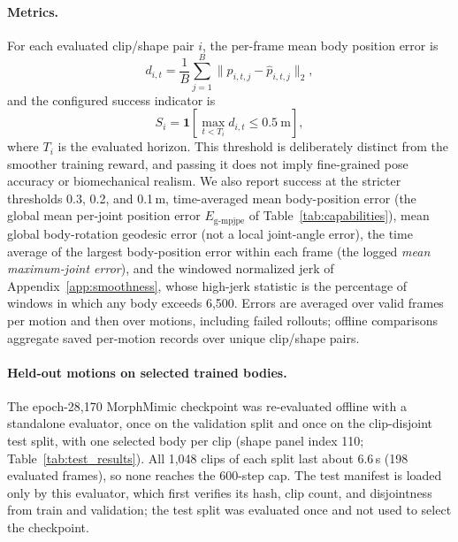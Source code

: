 \paragraph{Metrics.}\label{sec:metrics}
For each evaluated clip/shape pair $i$, the per-frame mean body position error is
\begin{equation}
    d_{i,t} = \frac{1}{B}\sum_{j=1}^{B}
                 \|p_{i,t,j}-\hat{p}_{i,t,j}\|_2 ,
\end{equation}
and the configured success indicator is
\begin{equation}
    S_i = \mathbf{1}\!\left[
             \max_{t<T_i}d_{i,t}\leq 0.5\ \mathrm{m}
          \right],
    \label{eq:success}
\end{equation}
where $T_i$ is the evaluated horizon. This threshold is deliberately distinct
from the smoother training reward, and passing it does not imply fine-grained
pose accuracy or biomechanical realism. We also report success at the stricter
thresholds 0.3, 0.2, and 0.1\,m, time-averaged mean
body-position error (the global mean per-joint position error $E_{\text{g-mpjpe}}$ of Table~\ref{tab:capabilities}), mean global body-rotation geodesic error (not a local
joint-angle error), the time average of the largest body-position error within
each frame (the logged \emph{mean maximum-joint error}), and the windowed
normalized jerk of Appendix~\ref{app:smoothness}, whose high-jerk statistic is
the percentage of windows in which any body exceeds 6,500. Errors are averaged
over valid frames per motion and then over motions, including failed rollouts;
offline comparisons aggregate saved per-motion records over unique clip/shape
pairs.

\paragraph{Held-out motions on selected trained bodies.}\label{sec:test_results}
The epoch-28,170 MorphMimic checkpoint was re-evaluated offline with a
standalone evaluator, once on the validation split and once on the clip-disjoint
test split, with one selected body per clip (shape panel index 110;
Table~\ref{tab:test_results}). All 1,048
clips of each split last about 6.6\,s (198 evaluated frames), so none reaches the
600-step cap. The test manifest is loaded only by this evaluator, which first
verifies its hash, clip count, and disjointness from train and validation; the
test split was evaluated once and not used to select the checkpoint.

